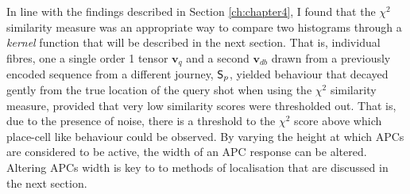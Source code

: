 In line with the findings described in Section \ref{ch:chapter4}, I found that the $\chi^2$ similarity measure was an appropriate way to compare two histograms through a \textit{kernel} function that will be described in the next section. That is, individual fibres, one a single order 1 tensor $\mathbf{v}_q$ and a second $\mathbf{v}_{db}$ drawn from a previously encoded sequence from a different journey, $\mathsf{S}_p$, yielded behaviour that decayed gently from the true location of the query shot when using the $\chi^2$ similarity measure, provided that very low similarity scores were thresholded out.  That is, due to the presence of noise, there is a threshold to the $\chi^2$ score above which place-cell like behaviour could be observed.  By varying the height at which APCs are considered to be active, the width of an APC response can be altered.  Altering APCs width is key to to methods of localisation that are discussed in the next section.  


%
%
%
%



